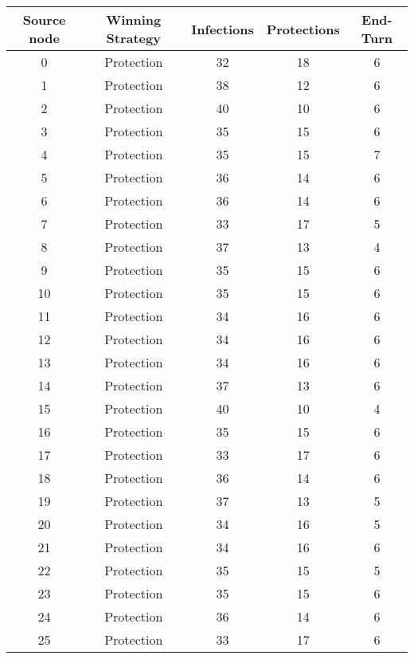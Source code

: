 \documentclass[results.tex]{subfiles}
\begin{document}
\begin{center}
  \begin{tabular}{| c || c | c | c | c |}
    \hline
    {\bfseries Source node} & {\bfseries Winning Strategy} & {\bfseries Infections} & {\bfseries Protections} & {\bfseries End-Turn} \\  %
    \hline\hline
    0 & Protection & 32 & 18 & 6 \\ 
    \hline
    1 & Protection & 38 & 12 & 6 \\ 
    \hline
    2 & Protection & 40 & 10 & 6 \\ 
    \hline
    3 & Protection & 35 & 15 & 6 \\ 
    \hline
    4 & Protection & 35 & 15 & 7 \\ 
    \hline
    5 & Protection & 36 & 14 & 6 \\ 
    \hline
    6 & Protection & 36 & 14 & 6 \\ 
    \hline
    7 & Protection & 33 & 17 & 5 \\ 
    \hline
    8 & Protection & 37 & 13 & 4 \\ 
    \hline
    9 & Protection & 35 & 15 & 6 \\ 
    \hline
    10 & Protection & 35 & 15 & 6 \\ 
    \hline
    11 & Protection & 34 & 16 & 6 \\ 
    \hline
    12 & Protection & 34 & 16 & 6 \\ 
    \hline
    13 & Protection & 34 & 16 & 6 \\ 
    \hline
    14 & Protection & 37 & 13 & 6 \\ 
    \hline
    15 & Protection & 40 & 10 & 4 \\ 
    \hline
    16 & Protection & 35 & 15 & 6 \\ 
    \hline
    17 & Protection & 33 & 17 & 6 \\ 
    \hline
    18 & Protection & 36 & 14 & 6 \\ 
    \hline
    19 & Protection & 37 & 13 & 5 \\ 
    \hline
    20 & Protection & 34 & 16 & 5 \\ 
    \hline
    21 & Protection & 34 & 16 & 6 \\ 
    \hline
    22 & Protection & 35 & 15 & 5 \\ 
    \hline
    23 & Protection & 35 & 15 & 6 \\ 
    \hline
    24 & Protection & 36 & 14 & 6 \\ 
    \hline
    25 & Protection & 33 & 17 & 6 \\ 

\end{tabular}
\end{center}
\end{document}
